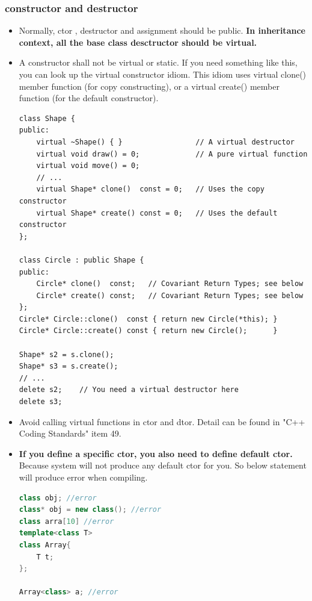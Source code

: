 \documentclass[a4paper,11pt,twoside]{book}
\begin{document}
\subsubsection{constructor and destructor}
\begin{itemize}

	\item Normally, ctor , destructor and assignment should be public. \textbf{In inheritance context, all the base class desctructor should be virtual. }
	
	\item A constructor shall not be virtual or static. If you need something like this, you can look up the virtual constructor idiom. This idiom uses virtual clone() member function (for copy constructing), or a virtual create() member function (for the default constructor).
	
\begin{lstlisting}
class Shape {
public:
	virtual ~Shape() { }                 // A virtual destructor
	virtual void draw() = 0;             // A pure virtual function
	virtual void move() = 0;
	// ...
	virtual Shape* clone()  const = 0;   // Uses the copy constructor
	virtual Shape* create() const = 0;   // Uses the default constructor
};

class Circle : public Shape {
public:
	Circle* clone()  const;   // Covariant Return Types; see below
	Circle* create() const;   // Covariant Return Types; see below
};
Circle* Circle::clone()  const { return new Circle(*this); }
Circle* Circle::create() const { return new Circle();      }

Shape* s2 = s.clone();
Shape* s3 = s.create();
// ...
delete s2;    // You need a virtual destructor here
delete s3;
\end{lstlisting}
	
	\item Avoid calling virtual functions in ctor and dtor. Detail can be found in "C++ Coding Standards" item 49.
	
	\item \textbf{If you define a specific ctor, you also need to define default ctor.} Because system will not produce any default ctor for you. So below statement will produce error when compiling.
\begin{lstlisting}[frame=single, language=c++]
class obj; //error
class* obj = new class(); //error
class arra[10] //error
template<class T>
class Array{
	T t;
};
	
Array<class> a; //error
	\end{lstlisting}
	

\end{itemize}
\end{document}
